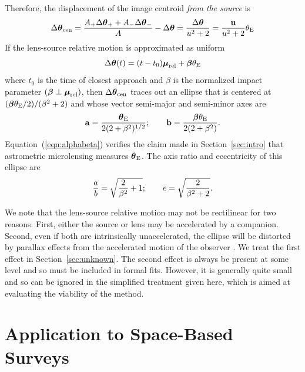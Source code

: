 \documentclass[12pt,preprint]{aastex}
\newcommand{\bdv}[1]{\mbox{\boldmath$#1$}}
\def\rel{{\rm rel}}
\def\cen{{\rm cen}}
\def\e{{\rm E}}
\def\bmu{{\bdv\mu}}
\def\btheta{{\bdv\theta}}
\def\bbeta{{\bdv\beta}}
\begin{document}
Therefore, the displacement of the image centroid {\it from the source} is
\begin{equation}
\Delta\btheta_\cen = 
{A_+\Delta\btheta_+ + A_-\Delta\btheta_-\over A} - \Delta\btheta 
= {\Delta\btheta\over u^2 + 2} = {{\bf u}\over u^2 + 2}\theta_\e
\label{eqn:thetacen}
\end{equation}
If the lens-source relative motion is approximated as uniform
\begin{equation}
\Delta\btheta(t) = (t-t_0)\bmu_\rel + \bbeta\theta_\e
\label{eqn:traj}
\end{equation}
where $t_0$ is the time of closest approach and $\beta$ is the normalized
impact parameter $(\bbeta\perp\bmu_\rel)$, then $\Delta\btheta_\cen$
traces out an ellipse that is centered at 
$(\bbeta\theta_\e/2)/(\beta^2 + 2)$ and whose vector semi-major and 
semi-minor axes are
\begin{equation}
{\bf a} = {\btheta_\e\over 2(2 + \beta^2)^{1/2}};
\qquad
{\bf b} = {\bbeta\theta_\e\over 2(2 + \beta^2)}.
\label{eqn:alphabeta}
\end{equation}
Equation~(\ref{eqn:alphabeta}) verifies the claim made in 
Section~\ref{sec:intro} that astrometric microlensing measures $\btheta_\e$.
The axis ratio and eccentricity of this ellipse are
\begin{equation}
{a\over b} = \sqrt{{2\over \beta^2} + 1};
\qquad
e = \sqrt{2\over \beta^2 + 2}.
\label{eqn:axis}
\end{equation}

We note that the lens-source relative motion may not be rectilinear
for two reasons.  First,  either the source or lens may be accelerated
by a companion.  Second, even if both 
are intrinsically unaccelerated, the ellipse will be distorted by
parallax effects from the accelerated motion of the observer
\citep{boden98}.  We treat the first effect in Section~\ref{sec:unknown}.
The second effect is always be present at some level and so must be
included in formal fits.  However, it is generally quite small and
so can be ignored in the simplified treatment given here, which is
aimed at evaluating the viability of the method.


\section{{Application to Space-Based Surveys}
\label{sec:space}}
\end{document}
